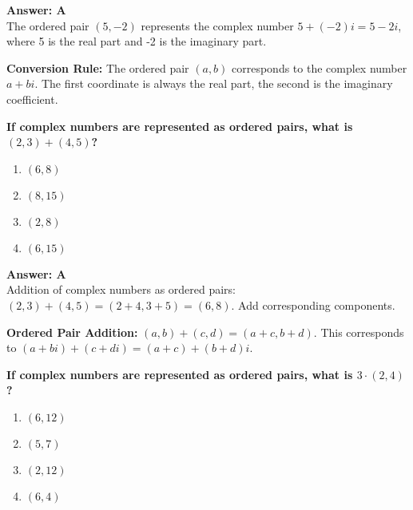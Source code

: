 \documentclass[12pt,a4paper]{article}
\begin{document}
\begin{answerstyle}
\textbf{Answer: A} \\
The ordered pair \( (5, -2) \) represents the complex number \( 5 + (-2)i = 5 - 2i \), where 5 is the real part and -2 is the imaginary part.
\end{answerstyle}

\begin{conceptbox}
\textbf{Conversion Rule:} The ordered pair \( (a, b) \) corresponds to the complex number \( a + bi \). The first coordinate is always the real part, the second is the imaginary coefficient.
\end{conceptbox}

\newpage
\begin{questiontitle}[MCQ 50]
\textbf{If complex numbers are represented as ordered pairs, what is \( (2, 3) + (4, 5) \)?}
\end{questiontitle}

\begin{partbox}[Options]
\begin{enumerate}[label=\Alph*.]
    \item \( (6, 8) \)
    \item \( (8, 15) \)
    \item \( (2, 8) \)
    \item \( (6, 15) \)
\end{enumerate}
\end{partbox}

\begin{answerstyle}
\textbf{Answer: A} \\
Addition of complex numbers as ordered pairs: \( (2, 3) + (4, 5) = (2 + 4, 3 + 5) = (6, 8) \). Add corresponding components.
\end{answerstyle}

\begin{conceptbox}
\textbf{Ordered Pair Addition:} \( (a, b) + (c, d) = (a + c, b + d) \). This corresponds to \( (a + bi) + (c + di) = (a + c) + (b + d)i \).
\end{conceptbox}

\newpage
\begin{questiontitle}[MCQ 51]
\textbf{If complex numbers are represented as ordered pairs, what is \( 3 \cdot (2, 4) \)?}
\end{questiontitle}

\begin{partbox}[Options]
\begin{enumerate}[label=\Alph*.]
    \item \( (6, 12) \)
    \item \( (5, 7) \)
    \item \( (2, 12) \)
    \item \( (6, 4) \)
\end{enumerate}
\end{partbox}
\end{document}
